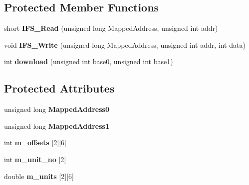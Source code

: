 \subsection*{Protected Member Functions}
\begin{DoxyCompactItemize}
\item 
\hypertarget{classnittaFS_a3a63e33a5deac3dc632a16e1f05037c9}{short {\bfseries I\-F\-S\-\_\-\-Read} (unsigned long Mapped\-Address, unsigned int addr)}\label{classnittaFS_a3a63e33a5deac3dc632a16e1f05037c9}

\item 
\hypertarget{classnittaFS_ab64069e55cdfacfe27ec0c0a12bf5ff4}{void {\bfseries I\-F\-S\-\_\-\-Write} (unsigned long Mapped\-Address, unsigned int addr, int data)}\label{classnittaFS_ab64069e55cdfacfe27ec0c0a12bf5ff4}

\item 
\hypertarget{classnittaFS_abda0312459b432cd9481f3cd5819e51f}{int {\bfseries download} (unsigned int base0, unsigned int base1)}\label{classnittaFS_abda0312459b432cd9481f3cd5819e51f}

\end{DoxyCompactItemize}
\subsection*{Protected Attributes}
\begin{DoxyCompactItemize}
\item 
\hypertarget{classnittaFS_a152198679f024b41db4471a6e2f572d9}{unsigned long {\bfseries Mapped\-Address0}}\label{classnittaFS_a152198679f024b41db4471a6e2f572d9}

\item 
\hypertarget{classnittaFS_a47dc1731b82ee6a1030079f2179aaca4}{unsigned long {\bfseries Mapped\-Address1}}\label{classnittaFS_a47dc1731b82ee6a1030079f2179aaca4}

\item 
\hypertarget{classnittaFS_ada2d920bb8cc5b1f65adf5a4849b7e87}{int {\bfseries m\-\_\-offsets} \mbox{[}2\mbox{]}\mbox{[}6\mbox{]}}\label{classnittaFS_ada2d920bb8cc5b1f65adf5a4849b7e87}

\item 
\hypertarget{classnittaFS_a73ec958173112fd21a0f05d949117c4d}{int {\bfseries m\-\_\-unit\-\_\-no} \mbox{[}2\mbox{]}}\label{classnittaFS_a73ec958173112fd21a0f05d949117c4d}

\item 
\hypertarget{classnittaFS_a6504b0630bfaf141bafcb251a85cd4ed}{double {\bfseries m\-\_\-units} \mbox{[}2\mbox{]}\mbox{[}6\mbox{]}}\label{classnittaFS_a6504b0630bfaf141bafcb251a85cd4ed}

\end{DoxyCompactItemize}


